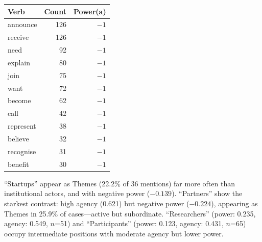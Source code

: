 \documentclass[../main.tex]{subfiles}
\begin{document}
\begin{center}
\small
\begin{tabular}{lrr}
\toprule
\textbf{Verb} & \textbf{Count} & \textbf{Power(a)} \\
\midrule
announce & 126 & $-1$ \\
receive & 126 & $-1$ \\
need & 92 & $-1$ \\
explain & 80 & $-1$ \\
join & 75 & $-1$ \\
want & 72 & $-1$ \\
become & 62 & $-1$ \\
call & 42 & $-1$ \\
represent & 38 & $-1$ \\
believe & 32 & $-1$ \\
recognise & 31 & $-1$ \\
benefit & 30 & $-1$ \\
\bottomrule
\end{tabular}
\end{center}


``Startups'' appear as Themes (22.2\% of 36 mentions) far more often than institutional actors, and with negative power ($-0.139$). ``Partners'' show the starkest contrast: high agency (0.621) but negative power ($-0.224$), appearing as Themes in 25.9\% of cases---active but subordinate. ``Researchers'' (power: 0.235, agency: 0.549, $n$=51) and ``Participants'' (power: 0.123, agency: 0.431, $n$=65) occupy intermediate positions with moderate agency but lower power.
\end{document}
